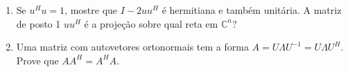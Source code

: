 \documentclass[12pt]{article}
\begin{document}
\begin{enumerate}
\item Se $u^Hu=1$, mostre que $I-2uu^H$ é hermitiana e também unitária. A matriz de posto 1 $uu^H$ é a projeção sobre qual reta em ${\mathbb{C}}^n$?

\item Uma matriz com autovetores ortonormais tem a forma $A=U\Lambda U^{-1}=U\Lambda U^H$. Prove que $AA^H=A^HA$. %



\end{enumerate}
\end{document}
